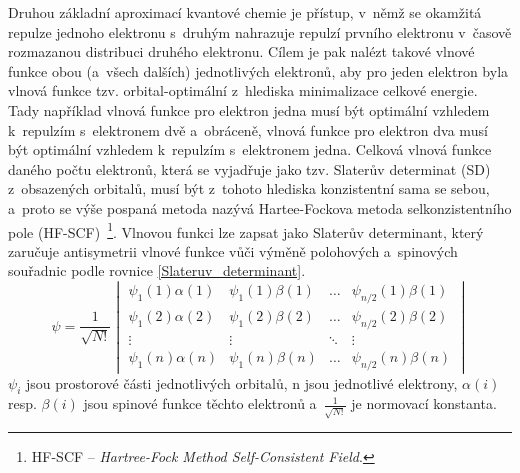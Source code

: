\documentclass[
digital, %
table,   %
nolof,     %
nolot,     %
oneside,
]{fithesis3}
\begin{document}
Druhou základní aproximací kvantové chemie je přístup, v~němž se okamžitá repulze jednoho elektronu s~druhým nahrazuje repulzí prvního elektronu v~časově rozmazanou distribuci druhého elektronu. Cílem je pak nalézt takové vlnové funkce obou (a~všech dalších) jednotlivých elektronů, aby pro jeden elektron byla vlnová funkce tzv. orbital-optimální z~hlediska minimalizace celkové energie. Tady například vlnová funkce pro elektron jedna musí být optimální vzhledem k~repulzím s~elektronem dvě a~obráceně, vlnová funkce pro elektron dva musí být optimální vzhledem k~repulzím s~elektronem jedna. Celková vlnová funkce daného počtu elektronů, která se vyjadřuje jako tzv. Slaterův determinat (SD) z~obsazených orbitalů, musí být z~tohoto hlediska konzistentní sama se sebou, a~proto se výše pospaná metoda nazývá Hartee-Fockova metoda selkonzistentního pole (HF-SCF)~\footnote{HF-SCF -- \textit{Hartree-Fock Method Self-Consistent Field}.}. Vlnovou funkci lze zapsat jako Slaterův determinant, který zaručuje antisymetrii vlnové funkce vůči výměně polohových a~spinových souřadnic podle rovnice \ref{Slateruv_determinant}.
\begin{equation}
\psi =  \frac{1}{\sqrt{N!}}\begin{vmatrix}
\psi_1(1)\alpha(1) & \psi_1(1) \beta (1)  & \dots & \psi_{n/2}(1)\beta(1) \\
\psi_1(2)\alpha(2) & \psi_1(2) \beta (2) & \dots & \psi_{n/2}(2)\beta(2) \\
\vdots             & \vdots                           & \ddots & \vdots \\
\psi_1(n)\alpha(n) & \psi_1(n) \beta (n) & \dots & \psi_{n/2}(n)\beta(n)
\end{vmatrix}
\label{Slateruv_determinant}
\end{equation}
$\psi_i$ jsou prostorové části jednotlivých orbitalů, n jsou jednotlivé elektrony, $\alpha(i)$ resp. $\beta(i)$ jsou spinové funkce těchto elektronů a~$\frac{1}{\sqrt{N!}}$ je normovací konstanta.
\end{document}

